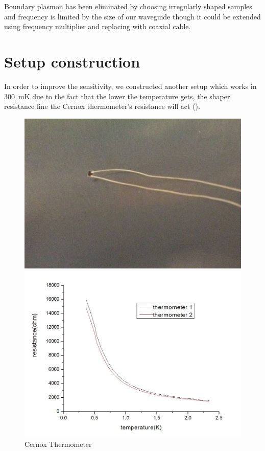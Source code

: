 \documentclass[12pt]{ruthesis}
\begin{document}
Boundary plasmon has been eliminated by choosing irregularly shaped samples and frequency is limited by the size of our waveguide though it could be extended using frequency multiplier and replacing with coaxial cable. 

 
\section{Setup construction}\label{Construction}

In order to improve the sensitivity, we constructed another setup which works in \SI{300}{\milli\kelvin} due to the fact that the lower the temperature gets, the shaper resistance line the Cernox thermometer's resistance will act ().

\begin{figure}[!htb]\centering
   \begin{minipage}{0.3\textwidth}
     \includegraphics[width=\linewidth]{figures/thermometercx.JPG}
     \caption{Cernox Thermometer}\label{thermometer}
   \end{minipage}
   \begin {minipage}{0.3\textwidth}
     \includegraphics[width=\linewidth]{figures/R(T).JPG}

\end{minipage}
\end{figure}
\end{document}
